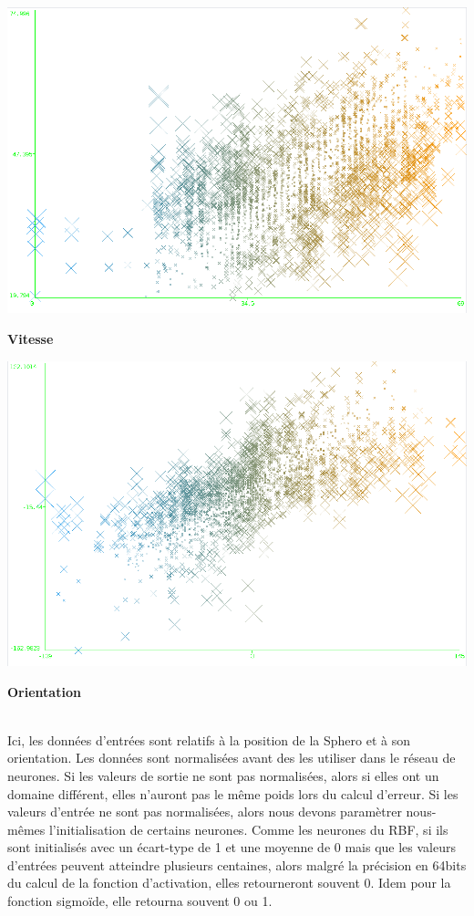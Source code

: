 \begin{minipage}[c]{\mpwekawidth}
 \includegraphics[width=\textwidth]{../figures/speed121314N1500H20.png}
 \begin{center}
  \textbf{Vitesse}
 \end{center}
\end{minipage}
\begin{minipage}[c]{\mpwekawidth}
 \includegraphics[width=\textwidth]{../figures/121314N1500H20.png}
 \begin{center}
  \textbf{Orientation}
 \end{center}
\end{minipage}
\\

Ici, les données d'entrées sont relatifs à la position de la Sphero et à son orientation.
Les données sont normalisées avant des les utiliser dans le réseau de neurones.
Si les valeurs de sortie ne sont pas normalisées, alors si elles ont un domaine différent, elles n'auront pas le même poids lors du calcul d'erreur.
Si les valeurs d'entrée ne sont pas normalisées, alors nous devons paramètrer nous-mêmes l'initialisation de certains neurones.
Comme les neurones du RBF, si ils sont initialisés avec un écart-type de 1 et une moyenne de 0 mais que les valeurs d'entrées peuvent atteindre plusieurs centaines,
alors malgré la précision en 64bits du calcul de la fonction d'activation, elles retourneront souvent 0.
Idem pour la fonction sigmoïde, elle retourna souvent 0 ou 1.

